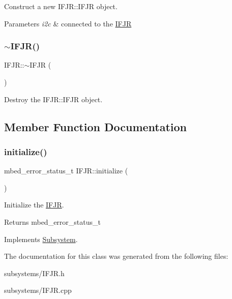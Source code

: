 Construct a new I\+F\+J\+R\+::\+I\+F\+JR object. 


\begin{DoxyParams}{Parameters}
{\em i2c} & connected to the \mbox{\hyperlink{class_i_f_j_r}{I\+F\+JR}} \\
\hline
\end{DoxyParams}
\mbox{\label{class_i_f_j_r_a02cc4eb03b4a7fdacbdb8e7f940b7daa}} 
\subsubsection{\texorpdfstring{$\sim$IFJR()}{~IFJR()}}
{\footnotesize\ttfamily I\+F\+J\+R\+::$\sim$\+I\+F\+JR (\begin{DoxyParamCaption}{ }\end{DoxyParamCaption})}



Destroy the I\+F\+J\+R\+::\+I\+F\+JR object. 



\subsection{Member Function Documentation}
\mbox{\label{class_i_f_j_r_a0a7d913d00e8573b613b980f17ed2fd4}} 
\subsubsection{\texorpdfstring{initialize()}{initialize()}}
{\footnotesize\ttfamily mbed\+\_\+error\+\_\+status\+\_\+t I\+F\+J\+R\+::initialize (\begin{DoxyParamCaption}{ }\end{DoxyParamCaption})\hspace{0.3cm}{\ttfamily [virtual]}}



Initialize the \mbox{\hyperlink{class_i_f_j_r}{I\+F\+JR}}. 

\begin{DoxyReturn}{Returns}
mbed\+\_\+error\+\_\+status\+\_\+t 
\end{DoxyReturn}


Implements \mbox{\hyperlink{class_subsystem_afa43e7c1c8b49e514b944f517d4dc905}{Subsystem}}.



The documentation for this class was generated from the following files\+:\begin{DoxyCompactItemize}
\item 
subsystems/I\+F\+J\+R.\+h\item 
subsystems/I\+F\+J\+R.\+cpp\end{DoxyCompactItemize}

